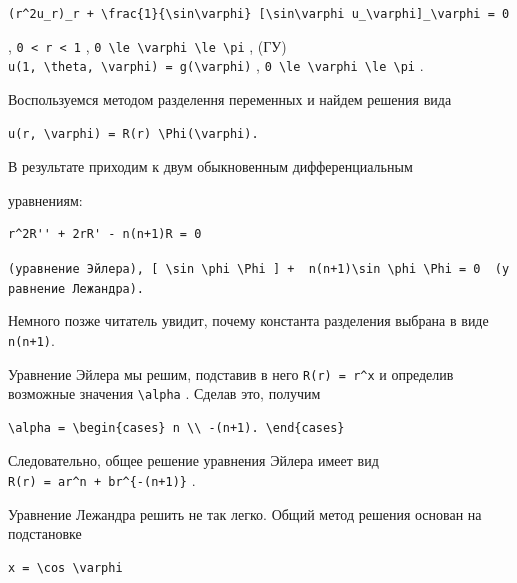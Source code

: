 \documentclass[
  ukrainian,
]{article}
\begin{document}
\texttt{(r\^{}2u\_r)\_r\ +\ \textbackslash{}frac\{1\}\{\textbackslash{}sin\textbackslash{}varphi\}\ {[}\textbackslash{}sin\textbackslash{}varphi\ u\_\textbackslash{}varphi{]}\_\textbackslash{}varphi\ =\ 0}

, \texttt{0\ \textless{}\ r\ \textless{}\ 1} ,
\texttt{0\ \textbackslash{}le\ \textbackslash{}varphi\ \textbackslash{}le\ \textbackslash{}pi}
, (ГУ)
\texttt{u(1,\ \textbackslash{}theta,\ \textbackslash{}varphi)\ =\ g(\textbackslash{}varphi)}
,
\texttt{0\ \textbackslash{}le\ \textbackslash{}varphi\ \textbackslash{}le\ \textbackslash{}pi}
.

Воспользуемся методом разделення переменных и найдем решения вида

\begin{verbatim}
u(r, \varphi) = R(r) \Phi(\varphi).
\end{verbatim}

В результате приходим к двум обыкновенным дифференциальным

уравнениям:

\begin{verbatim}
r^2R'' + 2rR' - n(n+1)R = 0
\end{verbatim}

\texttt{(уравнение\ Эйлера),\ {[}\ \textquotesingle{}\textbackslash{}sin\ \textbackslash{}phi\ \textbackslash{}Phi\textquotesingle{}\textquotesingle{}\ {]}\textquotesingle{}\ +\ \ \textquotesingle{}n(n+1)\textbackslash{}sin\ \textbackslash{}phi\ \textbackslash{}Phi\ =\ 0\textquotesingle{}\ \ (уравнение\ Лежандра).}

Немного позже читатель увидит, почему константа разделения выбрана в
виде \texttt{n(n+1)}.

Уравнение Эйлера мы решим, подставив в него \texttt{R(r)\ =\ r\^{}x} и
определив возможные значения \texttt{\textbackslash{}alpha} . Сделав
это, получим

\begin{verbatim}
\alpha = \begin{cases} n \\ -(n+1). \end{cases}
\end{verbatim}

Следовательно, общее решение уравнения Эйлера имеет вид
\texttt{R(r)\ =\ ar\^{}n\ +\ br\^{}\{-(n+1)\}} .

Уравнение Лежандра решить не так легко. Общий метод решения основан на
подстановке

\begin{verbatim}
x = \cos \varphi
\end{verbatim}
\end{document}
